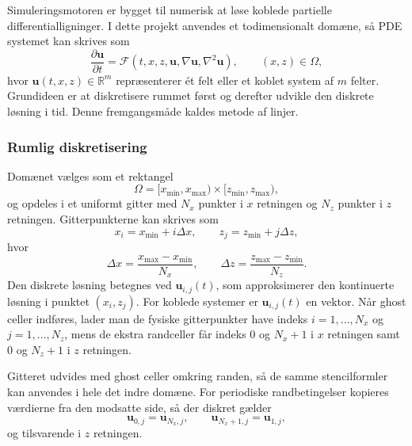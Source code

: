 Simuleringsmotoren er bygget til numerisk at løse koblede partielle differentialligninger. 
I dette projekt anvendes et todimensionalt domæne, så PDE systemet kan skrives som
\begin{equation}
    \frac{\partial \mathbf{u}}{\partial t}
    =
    \mathcal{F}\!\left(t,x,z,\mathbf{u},\nabla \mathbf{u},\nabla^2 \mathbf{u}\right),
    \qquad
    (x,z) \in \Omega ,
    \label{eq:general_pde_system}
\end{equation}
hvor $\mathbf{u}(t,x,z) \in \mathbb{R}^m$ repræsenterer ét felt eller et koblet system af $m$ felter. Grundideen er at diskretisere rummet først og derefter udvikle den diskrete løsning i tid. Denne fremgangsmåde kaldes metode af linjer.

\subsubsection{Rumlig diskretisering}
Domænet vælges som et rektangel
\[
    \Omega = [x_{\min},x_{\max}) \times [z_{\min},z_{\max}),
\]
og opdeles i et uniformt gitter med $N_x$ punkter i $x$ retningen og $N_z$ punkter i $z$ retningen. Gitterpunkterne kan skrives som
\[
    x_i = x_{\min} + i \Delta x,
    \qquad
    z_j = z_{\min} + j \Delta z,
\]
hvor
\[
    \Delta x = \frac{x_{\max}-x_{\min}}{N_x},
    \qquad
    \Delta z = \frac{z_{\max}-z_{\min}}{N_z}.
\]
Den diskrete løsning betegnes ved $\mathbf{u}_{i,j}(t)$, som approksimerer den kontinuerte løsning i punktet $(x_i,z_j)$. For koblede systemer er $\mathbf{u}_{i,j}(t)$ en vektor. Når ghost celler indføres, lader man de fysiske gitterpunkter have indeks $i=1,\dots,N_x$ og $j=1,\dots,N_z$, mens de ekstra randceller får indeks $0$ og $N_x+1$ i $x$ retningen samt $0$ og $N_z+1$ i $z$ retningen.

Gitteret udvides med ghost celler omkring randen, så de samme stencilformler kan anvendes i hele det indre domæne. For periodiske randbetingelser kopieres værdierne fra den modsatte side, så der diskret gælder
\[
    \mathbf{u}_{0,j} = \mathbf{u}_{N_x,j},
    \qquad
    \mathbf{u}_{N_x+1,j} = \mathbf{u}_{1,j},
\]
og tilsvarende i $z$ retningen.

